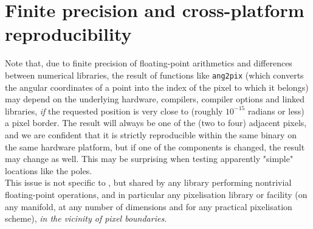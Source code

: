 \documentclass[12pt,twoside]{article}
\begin{document}
\section{Finite precision and cross-platform reproducibility}
Note that, due to finite precision of floating-point arithmetics and
differences between numerical libraries, the result of \healpix functions
like \texttt{ang2pix} (which converts the angular coordinates of a point into the index 
of the pixel to which it belongs) 
may depend on the underlying hardware, compilers,
compiler options and linked libraries, {\em if} the requested position is very
close to (roughly $10^{-15}$ radians or less) a pixel border. The result
will always be one of the (two to four) adjacent pixels, and we are
confident that it is strictly reproducible within the same binary on the
same hardware platform, but if one of the components is changed, the
result may change as well.
This may be surprising when testing apparently "simple" locations like
the poles.\\
This issue is not specific to \healpixns, but shared by any library
performing nontrivial floating-point operations, and in particular any
pixelisation library or facility 
(on any manifold, at any number of dimensions and for any practical pixelisation scheme), 
{\em in the vicinity of pixel boundaries}.



\newpage
\end{document}
